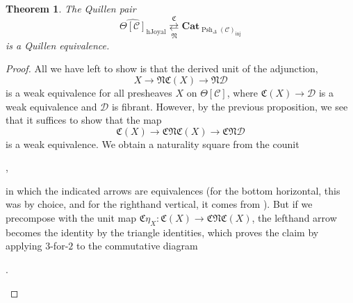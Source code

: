 \documentclass[leqno]{article}
\numberwithin{equation}{subsection}
\theoremstyle{plain}   %
\newtheorem{thm}[equation]{Theorem}
\theoremstyle{remark}
\theoremstyle{plain}
\newcommand{\Cat}{\ensuremath{\mathbf{Cat}}}
\providecommand{\C}{}
\renewcommand{\C}{\ensuremath{\mathcal{C}}}
\newcommand{\cellset}{\ensuremath{\widehat{\Theta[\mathcal{C}]}}}
\newcommand{\spsh}{\ensuremath{\operatorname{Psh}_\Delta(\mathcal{C})}}
\begin{document}
\begin{thm}\label{mainthm1}
	The Quillen pair
	\[\cellset_{\mathrm{hJoyal}} \underset{\mathfrak{N}}{\overset{\mathfrak{C}}{\rightleftarrows}} \Cat_{\spsh_{\mathrm{inj}}}\]
	is a Quillen equivalence.
\end{thm}
\begin{proof}
	All we have left to show is that the derived unit of the adjunction,
	\[X\to \mathfrak{N}\mathfrak{C}(X) \to \mathfrak{N}\mathcal{D}\]
	is a weak equivalence for all presheaves \(X\) on \(\Theta[\C]\), where \(\mathfrak{C}(X) \to \mathcal{D}\) is a weak equivalence and \(\mathcal{D}\) is fibrant.  However, by the previous proposition, we see that it suffices to show that the map
	\[\mathfrak{C}(X)\to \mathfrak{C}\mathfrak{N}\mathfrak{C}(X) \to \mathfrak{C}\mathfrak{N}\mathcal{D}\]
	is a weak equivalence.  We obtain a naturality square from the counit
	\begin{center}
		,
	\end{center}
	in which the indicated arrows are equivalences (for the bottom horizontal, this was by choice, and for the righthand vertical, it comes from ).  But if we precompose with the unit map \(\mathfrak{C}\eta_X:\mathfrak{C}(X)\to \mathfrak{C}\mathfrak{N}\mathfrak{C}(X)\), the lefthand arrow becomes the identity by the triangle identities, which proves the claim by applying \(3\)-for-\(2\) to the commutative diagram
	\begin{center}
		.
	\end{center}
\end{proof}
\end{document}
